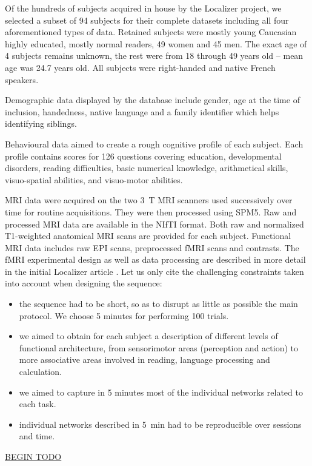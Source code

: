 \documentclass[review]{elsarticle}
\begin{document}
Of the hundreds of subjects acquired in house by the Localizer project, we selected a subset of 94 subjects for their complete datasets \cite{Pinel2012} including all four aforementioned types of data. Retained subjects were mostly young Caucasian highly educated, mostly normal readers, 49 women and 45 men. The exact age of 4 subjects remains unknown, the rest were from 18 through 49 years old -- mean age was 24.7 years old. All subjects were right-handed and native French speakers.

Demographic data displayed by the database include gender, age at the time of inclusion, handedness, native language and a family identifier which helps identifying siblings.

Behavioural data aimed to create a rough cognitive profile of each subject. Each profile contains scores for 126 questions covering education, developmental disorders, reading difficulties, basic numerical knowledge, arithmetical skills, visuo-spatial abilities, and visuo-motor abilities.

MRI data were acquired on the two 3~T MRI scanners used successively over time for routine acquisitions. They were then processed using SPM5. Raw and processed MRI data are available in the NIfTI format. Both raw and normalized T1-weighted anatomical MRI scans are provided for each subject. Functional MRI data includes raw EPI scans, preprocessed fMRI scans and contrasts. The fMRI experimental design as well as data processing are described in more detail in the initial Localizer article \cite{Pinel2007}. Let us only cite the challenging constraints taken
into account when designing the sequence:
\begin{itemize}
\item the sequence had to be short, so as to disrupt as little as possible the main protocol. We choose 5 minutes for performing 100 trials.
\item we aimed to obtain for each subject a description of different levels of functional architecture, from sensorimotor areas (perception and action) to more associative areas involved in reading, language processing and calculation.
\item we aimed to capture in 5 minutes most of the individual networks related to each task.
\item individual networks described in 5~min had to be reproducible over sessions and time.
\end{itemize}

\underline{BEGIN TODO}
\end{document}
